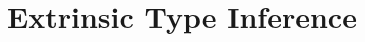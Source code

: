 \documentclass[acmsmall]{acmart}
\title{Extrinsic Type Inference}
\theoremstyle{definition}
\begin{document}
\newcommand{\Par}[1]{\paragraph{\textbf{#1}}}
\newcommand*{\code}{\fontfamily{pcr}\selectfont}
\newcommand{\J}[1]{\texttt{\small \code #1}}
\newcommand{\lab}[1]{\small \text{\color{Gray}\ [#1]}}
\newcommand{\entails}{\vdash}
\newcommand{\satisfies}{\vDash}
\newcommand{\given}{\dashv}
\newcommand{\with}{\ \diamond\ }
\newcommand{\notfree}{\ \#\ }
\newcommand{\consis}{\ \star}
\newcommand{\safe}{\ \checkmark}
\newcommand{\relational}{\ \Re}

\newcommand{\factorsinto}{\Vvdash}


\newcommand{\allsafe}{\ \Re\checkmark}



\newcommand{\foreign}{\varnothing}
\newcommand{\closed}{\bullet}
\newcommand{\local}{\blacktriangle}
\newcommand{\open}{\circ}




\newcommand{\multi}[1]{\widebar{\ #1\ }}
\newcommand{\hastype}{:}
\newcommand{\pattype}{\ \lozenge\ }
\newcommand{\liftfun}{:}
 
\newcommand{\subtypes}{<:}
\newcommand{\supertypes}{:>}
\newcommand{\I}{\hspace{4mm}}
\newcommand{\Z}{.\hspace{4mm}}
\newcommand{\Alpha}{\mathrm{A}}
\newcommand{\Tau}{\mathrm{T}}
\newcommand{\B}[1]{\textbf{#1}}
\newcommand{\F}[1]{\text{#1}}
\newcommand{\bigand}{\bigwedge\nolimits}
\newcommand{\bigor}{\bigvee\nolimits}
\newcommand{\C}[1]{\color{teal} \rhd\ \emph{#1}}
\newcommand{\com}[1]{\color{Gray}\I \emph{#1}}
\newcommand{\D}[1]{\small \textsc{#1}}
\newcommand{\FIG}[1]{Fig. {\color{red} \ref{#1}}}
\newcommand{\TODO}[1]{\noindent \B{\color{red} TODO: #1}}

\newcommand{\is}{\ ::=\ }
\newcommand{\sep}{\ \ |\ \ }
\newcommand{\nonterm}[1]{#1\ }
\newcommand{\contin}{|\ \ \ \ \ \ \ }
\newcommand{\case}{\B{case }}
\newcommand{\wrt}{\B{wrt }}
     


\newcommand{\tl}{\textasciitilde{}}
\newcommand{\typdiff}{\J{\textbackslash}}

\maketitle
\end{document}
